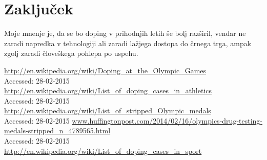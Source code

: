 \documentclass[11pt,a4paper]{article}
\begin{document}
\newpage
\section{Zaključek}
Moje mnenje je, da se bo doping v prihodnjih letih še bolj razširil, vendar ne zaradi napredka v tehnologiji ali zaradi lažjega dostopa do črnega trga, ampak zgolj zaradi človeškega pohlepa po uspehu.

\newpage
\begin{thebibliography}{4}
  \url{http://en.wikipedia.org/wiki/Doping_at_the_Olympic_Games}\\
  {Accessed: 28-02-2015}
  \url{http://en.wikipedia.org/wiki/List_of_doping_cases_in_athletics}\\
  {Accessed: 28-02-2015}
  \url{http://en.wikipedia.org/wiki/List_of_stripped_Olympic_medals}\\
  {Accessed: 28-02-2015}
  \url{www.huffingtonpost.com/2014/02/16/olympics-drug-testing-medals-stripped_n_4789565.html}\\
  {Accessed: 28-02-2015}
  \url{http://en.wikipedia.org/wiki/List_of_doping_cases_in_sport}
 

\end{thebibliography}
\end{document}
